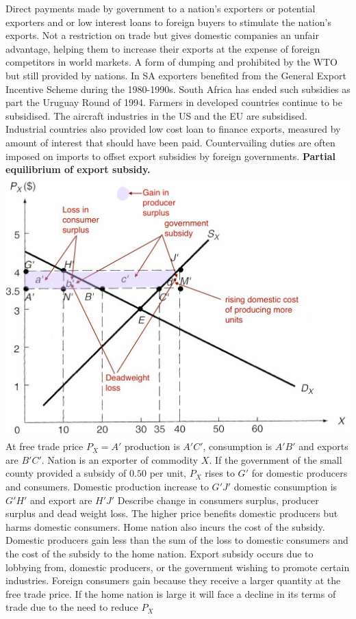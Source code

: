 \documentclass[12pt]{examnotes}
\begin{document}
\ra Direct payments made by government to a nation's exporters or potential exporters and or low interest loans to foreign buyers to stimulate the nation's exports. 
\ra Not a restriction on trade but gives domestic companies an unfair advantage, helping them to increase their exports at the expense of foreign competitors in world markets. 
\ra A form of dumping and prohibited by the WTO but still provided by nations.
\ra In SA exporters benefited from the General Export Incentive Scheme during the 1980-1990s. South Africa has ended such subsidies as part the Uruguay Round of 1994.
\ra Farmers in developed countries continue to be subsidised. The aircraft industries in the US and the EU are subsidised. Industrial countries also provided low cost loan to finance exports, measured by amount of interest that should have been paid.
\ra Countervailing duties are often imposed on imports to offset export subsidies by foreign governments.
{\bf Partial equilibrium of export subsidy.}
\includegraphics[scale=0.3]{./imgs/92.jpg}
\ra At free trade price $P_X=A\prime$ production is $A\prime C\prime$, consumption is $A \prime B \prime$ and exports are $B \prime C \prime$. Nation is an exporter of commodity $X$.
\ra If the government of the small county provided a subsidy of $0.50$ per unit, $P_X$ rises to $G \prime$ for domestic producers and consumers. Domestic production increase to $G \prime J \prime$ domestic consumption is $G \prime H \prime$ and export are $H \prime J \prime$
\ra *Describe change in consumers surplus, producer surplus and dead weight loss.
\ra The higher price benefits domestic producers but harms domestic consumers. Home nation also incurs the cost of the subsidy. Domestic producers gain less than the sum of the loss to domestic consumers and the cost of the subsidy to the home nation.
\ra Export subsidy occurs due to lobbying from, domestic producers, or the government wishing to promote certain industries.
\ra Foreign consumers gain because they receive a larger quantity at the free trade price.
\ra If the home nation is large it will face a decline in its terms of trade due to the need to reduce $P_X$
\end{document}
